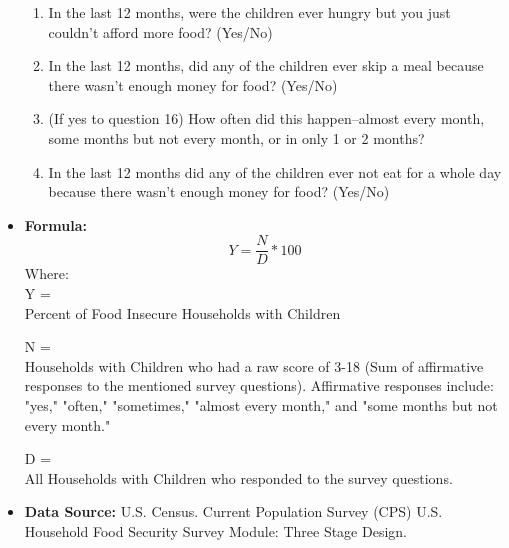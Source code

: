 \documentclass[12pt,letterpaper]{report}
\begin{document}
\begin{itemize}
\begin{enumerate}
  \item In the last 12 months, were the children ever hungry but you just couldn't afford more food? (Yes/No)
  \item In the last 12 months, did any of the children ever skip a meal because there wasn't enough money for food? (Yes/No)
  \item (If yes to question 16) How often did this happen--almost every month, some months but not every month, or in only 1 or 2 months?
  \item In the last 12 months did any of the children ever not eat for a whole day because there wasn't enough money for food? (Yes/No)
\end{enumerate}
		\item \textbf{Formula:} 
			\begin{equation}
				Y = \frac{N}{D} *100
			\end{equation}
Where: \\
			Y = \\Percent of Food Insecure Households with Children
			
			N = \\Households with Children who had a raw score of 3-18 (Sum of affirmative responses to the mentioned survey questions). Affirmative responses include: "yes," "often," "sometimes," "almost every month," and "some months but not every month." 
			
			D = \\All Households with Children who responded to the survey questions. 
			
		\item \textbf{Data Source:} U.S. Census. Current Population Survey (CPS) U.S. Household Food Security Survey Module: Three Stage Design.
	\end{itemize}
\end{document}
